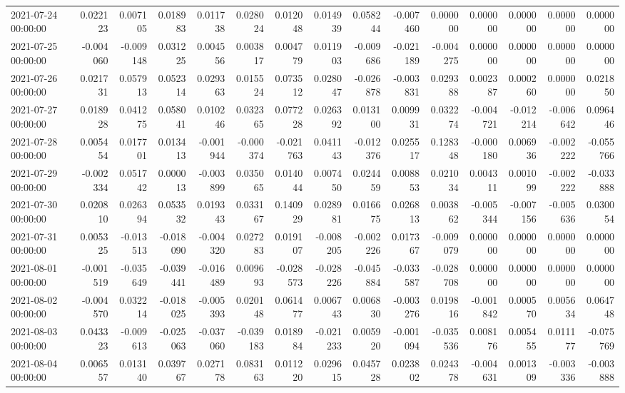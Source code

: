 \begin{tabular}{lrrrrrrrrrrrrrr}
2021-07-24 00:00:00 & 0.022123 & 0.007105 & 0.018983 & 0.011738 & 0.028024 & 0.012048 & 0.014939 & 0.058244 & -0.007460 & 0.000000 & 0.000000 & 0.000000 & 0.000000 & 0.000000 \\
2021-07-25 00:00:00 & -0.004060 & -0.009148 & 0.031225 & 0.004556 & 0.003817 & 0.004779 & 0.011903 & -0.009686 & -0.021189 & -0.004275 & 0.000000 & 0.000000 & 0.000000 & 0.000000 \\
2021-07-26 00:00:00 & 0.021731 & 0.057913 & 0.052314 & 0.029363 & 0.015524 & 0.073512 & 0.028047 & -0.026878 & -0.003831 & 0.029388 & 0.002387 & 0.000260 & 0.000000 & 0.021850 \\
2021-07-27 00:00:00 & 0.018928 & 0.041275 & 0.058041 & 0.010246 & 0.032365 & 0.077228 & 0.026392 & 0.013100 & 0.009931 & 0.032274 & -0.004721 & -0.012214 & -0.006642 & 0.096446 \\
2021-07-28 00:00:00 & 0.005454 & 0.017701 & 0.013413 & -0.001944 & -0.000374 & -0.021763 & 0.041143 & -0.012376 & 0.025517 & 0.128348 & -0.000180 & 0.006936 & -0.002222 & -0.055766 \\
2021-07-29 00:00:00 & -0.002334 & 0.051742 & 0.000013 & -0.003899 & 0.035065 & 0.014044 & 0.007450 & 0.024459 & 0.008853 & 0.021034 & 0.004311 & 0.001099 & -0.002222 & -0.033888 \\
2021-07-30 00:00:00 & 0.020810 & 0.026394 & 0.053532 & 0.019343 & 0.033167 & 0.140929 & 0.028981 & 0.016675 & 0.026813 & 0.003862 & -0.005344 & -0.007156 & -0.005636 & 0.030054 \\
2021-07-31 00:00:00 & 0.005325 & -0.013513 & -0.018090 & -0.004320 & 0.027283 & 0.019107 & -0.008205 & -0.002226 & 0.017367 & -0.009079 & 0.000000 & 0.000000 & 0.000000 & 0.000000 \\
2021-08-01 00:00:00 & -0.001519 & -0.035649 & -0.039441 & -0.016489 & 0.009693 & -0.028573 & -0.028226 & -0.045884 & -0.033587 & -0.028708 & 0.000000 & 0.000000 & 0.000000 & 0.000000 \\
2021-08-02 00:00:00 & -0.004570 & 0.032214 & -0.018025 & -0.005393 & 0.020148 & 0.061477 & 0.006743 & 0.006830 & -0.003276 & 0.019816 & -0.001842 & 0.000570 & 0.005634 & 0.064748 \\
2021-08-03 00:00:00 & 0.043323 & -0.009613 & -0.025063 & -0.037060 & -0.039183 & 0.018984 & -0.021233 & 0.005920 & -0.001094 & -0.035536 & 0.008176 & 0.005455 & 0.011177 & -0.075769 \\
2021-08-04 00:00:00 & 0.006557 & 0.013140 & 0.039767 & 0.027178 & 0.083163 & 0.011220 & 0.029615 & 0.045728 & 0.023802 & 0.024378 & -0.004631 & 0.001309 & -0.003336 & -0.003888 \\

\end{tabular}
